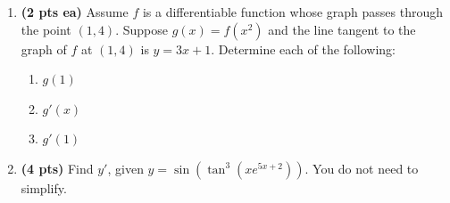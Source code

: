 \documentclass[12pt]{article}
\begin{document}
\begin{enumerate}[1.]




\newpage 
%	


\item {\bf (2 pts ea)} %
Assume $f$ is a differentiable function whose graph passes through the point $(1,4)$.  Suppose $g(x)=f(x^2)$ and the line tangent to the graph of $f$ at $(1,4)$ is $y=3x+1$.  Determine each of the following:
\begin{enumerate}
	\item $g(1)$
	\vspace{2pc}
	
	\item $g'(x)$
	\vspace{2pc}
	
	\item $g'(1)$
	\vspace{1pc}
\end{enumerate}

\item {\bf (4 pts)} %
Find $y'$, given 
	$y=\sin{(\tan^3{(xe^{5x+2})})}$.  You do not need to simplify.
	\vspace{18pc}
%		
%	


\end{enumerate}
\end{document}
